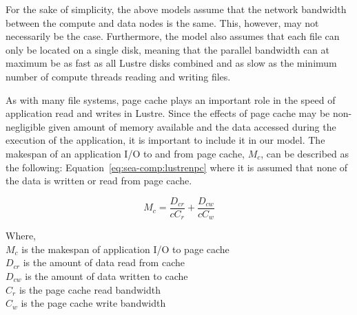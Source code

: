 \documentclass[10pt,journal,compsoc]{IEEEtran}
\begin{document}
      For the sake of simplicity, the above models assume that the network
      bandwidth between the compute and data nodes is the same. This,
      however, may not necessarily be the case. Furthermore, the model also
      assumes that each file can only be located on a single disk, meaning that
      the parallel bandwidth can at maximum be as fast as all Lustre disks
      combined and as slow as the minimum number of compute threads reading and
      writing files.

      As with many file systems, page cache plays an important role in the speed
      of application read and writes in Lustre. Since the effects of page cache
      may be non-negligible given amount of memory available and the data
      accessed during the execution of the application, it is important to
      include it in our model. The makespan of an application I/O to and from
      page cache, $M_{c}$, can be described as the following:
      Equation~\ref{eq:sea-comp:lustrenpc} where it is assumed that none of the
      data is written or read from page cache.


      \begin{equation}\label{eq:sea-comp:cache}
          M_{c} = \frac{D_{cr}}{cC_{r}} + \frac{D_{cw}}{cC_{w}}
      \end{equation}

      {\noindent}
      Where, \\
      $M_{c}$ is the makespan of application I/O to page cache \\
      $D_{cr}$ is the amount of data read from cache \\
      $D_{cw}$ is the amount of data written to cache \\
      $C_{r}$ is the page cache read bandwidth \\
      $C_{w}$ is the page cache write bandwidth \\ 


    

\end{document}
